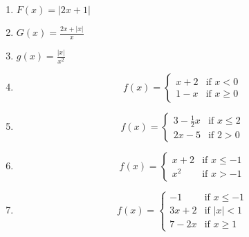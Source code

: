 \documentclass{article}
\begin{document}
\begin{enumerate}
		\item $F(x) = | 2x + 1 |$

		\item $G(x) = \frac{2x + |x|}{x}$

		\item $g(x) = \frac{ |x| }{x^2}$

		\item  

\begin{displaymath}
   f(x) = \left\{
     \begin{array}{lr}
       x + 2 & \text{if } x < 0\\
       1 - x &  \text{if } x \geq 0 
     \end{array}
   \right.
\end{displaymath} 

		\item

\begin{displaymath}
   f(x) = \left\{
     \begin{array}{lr}
       3 - \frac{1}{2}x & \text{if } x \leq 2\\
       2x - 5 &  \text{if } 2 > 0 
     \end{array}
   \right.
\end{displaymath} 

		\item

\begin{displaymath}
   f(x) = \left\{
     \begin{array}{lr}
       x + 2 & \text{if } x \leq -1\\
       x^2 &  \text{if } x > -1 
     \end{array}
   \right.
\end{displaymath} 

		\item

\begin{displaymath}
   f(x) = \left\{
     \begin{array}{lr}
       -1 & \text{if } x \leq -1\\
       3x + 2 &  \text{if } |x| < 1\\
       7 - 2x  & \text{if } x \geq 1
     \end{array}
   \right.
\end{displaymath} 

	\end{enumerate}
\end{document}
